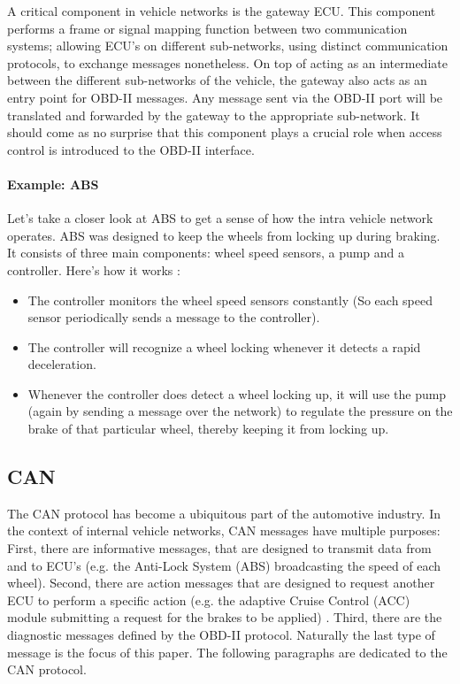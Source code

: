 A critical component in vehicle networks is the gateway ECU. This component performs a frame or signal mapping function between two communication systems; allowing ECU's on different sub-networks, using distinct communication protocols, to exchange messages nonetheless. 
On top of acting as an intermediate between the different sub-networks of the vehicle, the gateway also acts as an entry point for OBD-II messages. Any message sent via the OBD-II port will be translated and forwarded by the gateway to the appropriate sub-network. It should come as no surprise that this component plays a crucial role when access control is introduced to the OBD-II interface.

\paragraph{Example: ABS}
Let's take a closer look at ABS to get a sense of how the intra vehicle network operates. ABS was designed to keep the wheels from locking up during braking. It consists of three main components: wheel speed sensors, a pump and a controller. Here's how it works \cite{wiki:ABS}:

\begin{itemize}
	\item The controller monitors the wheel speed sensors constantly (So each speed sensor periodically sends a message to the controller).
	
	\item The controller will recognize a wheel locking whenever it detects a rapid deceleration.
	
	\item Whenever the controller does detect a wheel locking up, it will use the pump (again by sending a message over the network) to regulate the pressure on the brake of that particular wheel, thereby keeping it from locking up.
\end{itemize}

\subsection{CAN}
\label{sec:can}

The CAN protocol has become a ubiquitous part of the automotive industry. In the context of internal vehicle networks, CAN messages have multiple purposes: First, there are informative messages, that are designed to transmit data from and to ECU's (e.g. the Anti-Lock System (ABS) broadcasting the speed of each wheel). Second, there are action messages that are designed to request another ECU to perform a specific action (e.g. the adaptive Cruise Control (ACC) module submitting a request for the brakes to be applied) \cite{CANhistory}. Third, there are the diagnostic messages defined by the OBD-II protocol. Naturally the last type of message is the focus of this paper. The following paragraphs are dedicated to the CAN protocol.

